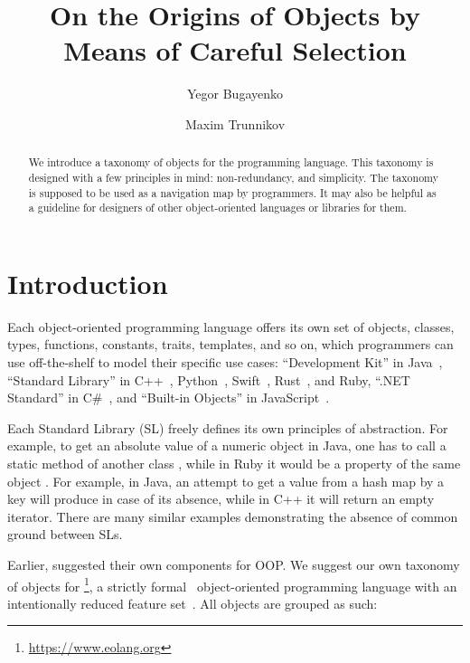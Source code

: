 \documentclass[sigplan,nonacm]{acmart}
\title{On the Origins of Objects by Means of Careful Selection}
\author{Yegor Bugayenko}
\affiliation{
  \institution{Huawei}
  \country{Russia}
  \city{Moscow}
}
\author{Maxim Trunnikov}
\affiliation{
  \institution{Huawei}
  \country{Russia}
  \city{Moscow}
}
\begin{document}
\begin{abstract}
We introduce a taxonomy of objects for the \eolang{} programming language.
This taxonomy is designed with a few principles in mind: non-redundancy, and simplicity.
The taxonomy is supposed to be used as a navigation map by \eolang{} programmers.
It may also be helpful as a guideline for designers of other object-oriented languages or libraries for them.
\end{abstract}

\maketitle

\section{Introduction}

Each object-oriented programming language offers its own set of objects, classes, types, functions, constants, traits, templates, and so on, which programmers can use off-the-shelf to model their specific use cases:
``Development Kit'' in Java~\citep{jdk2024,jdk8},
``Standard Library'' in
  C++~\citep{cpp2024,josuttis2012cpp},
  Python~\citep{python2024,hellmann2017python},
  Swift~\citep{swift2024,deitel2015swift},
  Rust~\citep{rust2024,blandy2021rust},
  and
  Ruby,
``.NET Standard'' in C\#~\citep{net2023,abrams2005net},
and ``Built-in Objects'' in JavaScript~\citep{js2024,crockford2008js}.

Each Standard Library (SL) freely defines its own principles of abstraction.
For example, to get an absolute value of a numeric object  in Java, one has to call a static method of another class , while in Ruby it would be a property of the same object .
For example, in Java, an attempt to get a value from a hash map by a key will produce  in case of its absence, while in C++ it will return an empty iterator.
There are many similar examples demonstrating the absence of common ground between SLs.

Earlier, \citet{booch1990design} suggested their own components for OOP.
We suggest our own taxonomy of objects for \eolang{}\footnote{\url{https://www.eolang.org}}, a strictly formal~\citep{kudasov2022formalizing} object-oriented programming language with an intentionally reduced feature set~\citep{bugayenko2021eolang}.
All objects are grouped as such:
\end{document}
